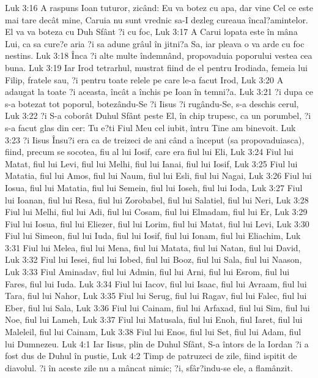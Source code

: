 Luk 3:16  A raspuns Ioan tuturor, zicând: Eu va botez cu apa, dar vine Cel ce este mai tare decât mine, Caruia nu sunt vrednic sa-I dezleg cureaua încal?amintelor. El va va boteza cu Duh Sfânt ?i cu foc,
Luk 3:17  A Carui lopata este în mâna Lui, ca sa cure?e aria ?i sa adune grâul în jitni?a Sa, iar pleava o va arde cu foc nestins.
Luk 3:18  Înca ?i alte multe îndemnând, propovaduia poporului vestea cea buna.
Luk 3:19  Iar Irod tetrarhul, mustrat fiind de el pentru Irodiada, femeia lui Filip, fratele sau, ?i pentru toate relele pe care le-a facut Irod,
Luk 3:20  A adaugat la toate ?i aceasta, încât a închis pe Ioan în temni?a.
Luk 3:21  ?i dupa ce s-a botezat tot poporul, botezându-Se ?i Iisus ?i rugându-Se, s-a deschis cerul,
Luk 3:22  ?i S-a coborât Duhul Sfânt peste El, în chip trupesc, ca un porumbel, ?i s-a facut glas din cer: Tu e?ti Fiul Meu cel iubit, întru Tine am binevoit.
Luk 3:23  ?i Iisus Însu?i era ca de treizeci de ani când a început (sa propovaduiasca), fiind, precum se socotea, fiu al lui Iosif, care era fiul lui Eli,
Luk 3:24  Fiul lui Matat, fiul lui Levi, fiul lui Melhi, fiul lui Ianai, fiul lui Iosif,
Luk 3:25  Fiul lui Matatia, fiul lui Amos, fiul lui Naum, fiul lui Esli, fiul lui Nagai,
Luk 3:26  Fiul lui Iosua, fiul lui Matatia, fiul lui Semein, fiul lui Ioseh, fiul lui Ioda,
Luk 3:27  Fiul lui Ioanan, fiul lui Resa, fiul lui Zorobabel, fiul lui Salatiel, fiul lui Neri,
Luk 3:28  Fiul lui Melhi, fiul lui Adi, fiul lui Cosam, fiul lui Elmadam, fiul lui Er,
Luk 3:29  Fiul lui Iosua, fiul lui Eliezer, fiul lui Lorim, fiul lui Matat, fiul lui Levi,
Luk 3:30  Fiul lui Simeon, fiul lui Iuda, fiul lui Iosif, fiul lui Ionam, fiul lui Eliachim,
Luk 3:31  Fiul lui Melea, fiul lui Mena, fiul lui Matata, fiul lui Natan, fiul lui David,
Luk 3:32  Fiul lui Iesei, fiul lui Iobed, fiul lui Booz, fiul lui Sala, fiul lui Naason,
Luk 3:33  Fiul Aminadav, fiul lui Admin, fiul lui Arni, fiul lui Esrom, fiul lui Fares, fiul lui Iuda.
Luk 3:34  Fiul lui Iacov, fiul lui Isaac, fiul lui Avraam, fiul lui Tara, fiul lui Nahor,
Luk 3:35  Fiul lui Serug, fiul lui Ragav, fiul lui Falec, fiul lui Eber, fiul lui Sala,
Luk 3:36  Fiul lui Cainam, fiul lui Arfaxad, fiul lui Sim, fiul lui Noe, fiul lui Lameh,
Luk 3:37  Fiul lui Matusala, fiul lui Enoh, fiul Iaret, fiul lui Maleleil, fiul lui Cainam,
Luk 3:38  Fiul lui Enos, fiul lui Set, fiul lui Adam, fiul lui Dumnezeu.
Luk 4:1  Iar Iisus, plin de Duhul Sfânt, S-a întors de la Iordan ?i a fost dus de Duhul în pustie,
Luk 4:2  Timp de patruzeci de zile, fiind ispitit de diavolul. ?i în aceste zile nu a mâncat nimic; ?i, sfâr?indu-se ele, a flamânzit.
